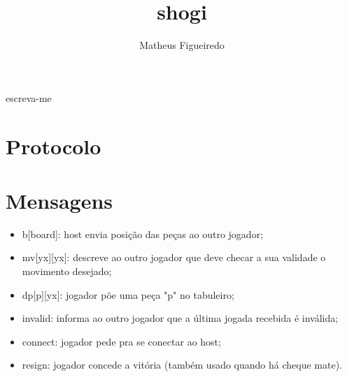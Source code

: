\documentclass[12pt]{article}
\title{shogi}
\author{Matheus Figueiredo}
\begin{document}
\maketitle

\begin{abstract}
\end{abstract}

\begin{resumo}
  escreva-me
\end{resumo}

\newpage
\section{Protocolo}


\section{Mensagens}
\begin{itemize}
\item b[board]: host envia posição das peças ao outro jogador;
\item mv[yx][yx]: descreve ao outro jogador que deve checar a sua validade o movimento desejado;
\item dp[p][yx]: jogador põe uma peça "p" no tabuleiro;
\item invalid: informa ao outro jogador que a última jogada recebida é inválida;
\item connect: jogador pede pra se conectar ao host;
\item resign: jogador concede a vitória (também usado quando há cheque mate).
\end{itemize}



\end{document}
